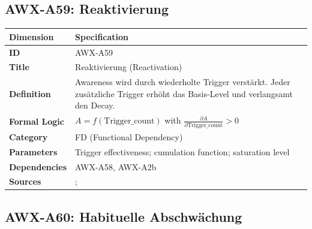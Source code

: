 
\subsection{AWX-A59: Reaktivierung}

\begin{table}[htbp]
\small
\begin{tabular}{p{3cm}p{11cm}}
\toprule
\textbf{Dimension} & \textbf{Specification} \\
\midrule
\textbf{ID} & AWX-A59 \\
\textbf{Title} & Reaktivierung (Reactivation) \\
\textbf{Definition} & Awareness wird durch wiederholte Trigger verstärkt. Jeder zusätzliche Trigger erhöht das Basis-Level und verlangsamt den Decay. \\
\textbf{Formal Logic} & $A = f(\text{Trigger\_count})$ with $\frac{\partial A}{\partial \text{Trigger\_count}} > 0$ \\
\textbf{Category} & FD (Functional Dependency) \\
\textbf{Parameters} & Trigger effectiveness; cumulation function; saturation level \\
\textbf{Dependencies} & AWX-A58, AWX-A2b \\
\textbf{Sources} & \citet{karpicke2008retrieval}; \citet{roediger2006power} \\
\bottomrule
\end{tabular}
\end{table}


\subsection{AWX-A60: Habituelle Abschwächung}

